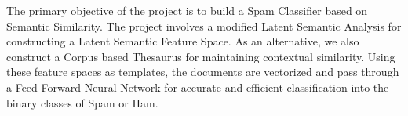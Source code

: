 The primary objective of the project is to build a Spam Classifier based on Semantic Similarity. The project involves a modified Latent Semantic Analysis for constructing a Latent Semantic Feature Space. As an alternative, we also construct a Corpus based Thesaurus for maintaining contextual similarity. Using these feature spaces as templates, the documents are vectorized and pass through a Feed Forward Neural Network for accurate and efficient classification into the binary classes of Spam or Ham.
